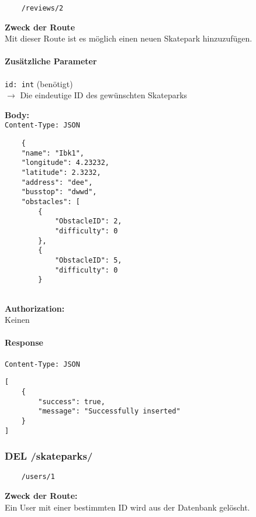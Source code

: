 \begin{lstlisting}
    /reviews/2
\end{lstlisting}

\textbf{Zweck der Route} \\
Mit dieser Route ist es möglich einen neuen Skatepark hinzuzufügen.





\paragraph{Zusätzliche Parameter}
\lstinline{id: int} (benötigt) \\
$\rightarrow$ Die eindeutige ID des gewünschten Skateparks


\textbf{Body:} \\
\lstinline{Content-Type: JSON}
\begin{lstlisting}
    {
    "name": "Ibk1",
    "longitude": 4.23232,
    "latitude": 2.3232,
    "address": "dee",
    "busstop": "dwwd",
    "obstacles": [
        {
            "ObstacleID": 2,
            "difficulty": 0
        },
        {
            "ObstacleID": 5,
            "difficulty": 0
        }
    
\end{lstlisting}

\textbf{Authorization:} \\
Keinen

\paragraph{Response }

\lstinline{Content-Type: JSON}
\begin{lstlisting}
[
    {
        "success": true,
        "message": "Successfully inserted"
    }
]
\end{lstlisting}

\pagebreak


\subsubsection{DEL /skateparks/}

\begin{lstlisting}
    /users/1
\end{lstlisting}

\textbf{Zweck der Route:} \\
Ein User mit einer bestimmten ID wird aus der Datenbank gelöscht.

